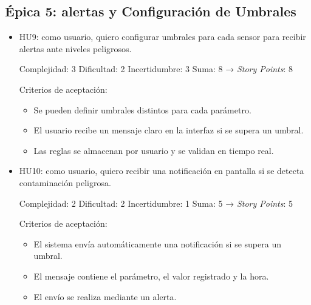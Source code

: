 \documentclass[
11pt, %
]{charter}
\begin{document}
\subsection*{Épica 5: alertas y Configuración de Umbrales}
\begin{itemize}
	\item HU9: como usuario, quiero configurar umbrales para cada sensor para recibir alertas ante niveles peligrosos.

	Complejidad: 3
	Dificultad: 2
	Incertidumbre: 3
	Suma: 8 → \textit{Story Points}: 8

	Criterios de aceptación:
	\begin{itemize}
		\item Se pueden definir umbrales distintos para cada parámetro.
		\item El usuario recibe un mensaje claro en la interfaz si se supera un umbral.
		\item Las reglas se almacenan por usuario y se validan en tiempo real.
	\end{itemize}
	\item HU10: como usuario, quiero recibir una notificación en pantalla si se detecta contaminación peligrosa.

	Complejidad: 2
	Dificultad: 2
	Incertidumbre: 1
	Suma: 5 → \textit{Story Points}: 5

	Criterios de aceptación:
	\begin{itemize}
		\item El sistema envía automáticamente una notificación si se supera un umbral.
		\item El mensaje contiene el parámetro, el valor registrado y la hora.
		\item El envío se realiza mediante un alerta.
	\end{itemize}
\end{itemize}
\end{document}
